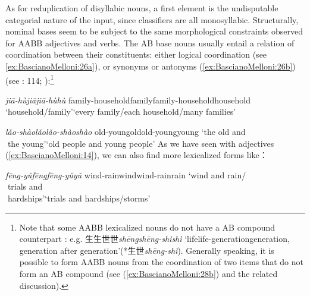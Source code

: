 \documentclass[output=paper]{langsci/langscibook}
\begin{document}
As for reduplication of disyllabic nouns, a first element is the
undisputable categorial nature of the input, since classifiers are all
monosyllabic. Structurally, nominal bases seem to be subject to the same
morphological constraints observed for AABB adjectives and verbs. The AB
base nouns usually entail a relation of coordination between their
constituents: either logical coordination (see \ref{ex:BascianoMelloni:26a}), or synonyms or
antonyms (\ref{ex:BascianoMelloni:26b}) %
(see %
\citealt{Tang79}%
%
: 114; 
\citealt{Zhang2015}
):\footnote{Note that some
  AABB lexicalized nouns do not have a AB compound counterpart %
\citep[see][12]{Wu01}%
%
: e.g.
  生生世世\emph{shēng\tld{}shēng-shì\tld{}shì}
  `life\tld{}life-generation\tld{}generation,
  generation after generation'(*\hspace*{-.1pt}生世\emph{shēng-shì}). Generally
  speaking, it is possible to form AABB nouns from the coordination of
  two items that do not form an AB compound (see (\ref{ex:BascianoMelloni:28b}) and the related
  discussion).}

\ea\label{ex:BascianoMelloni:26}
\ea\label{ex:BascianoMelloni:26a}%
        {\emph{jiā-hù}}{\emph{jiā\tld{}jiā-hù\tld{}hù}}%
        {family-household}{family\emph{\tld{}}family-household\emph{\tld{}}household}%
        {`household/family'}{`every family/each household/many families'}%

\ex\label{ex:BascianoMelloni:26b}%
        {\emph{lǎo-shào}}{\emph{lǎo\tld{}lǎo-shào\tld{}shào}}%
        {old-young}{old\emph{\tld{}}old-young\emph{\tld{}}young}%
        {`the old and\\ \textcolor{white}{`}the young'}{`old people and young people'}%
\z\z
As we have seen with adjectives (\ref{ex:BascianoMelloni:14}), we can also find more lexicalized
forms like：

\ea\label{ex:BascianoMelloni:27}
\ea\label{ex:BascianoMelloni:27a}%
        {\emph{fēng-yǔ}}{\emph{fēng\tld{}fēng-yǔ\tld{}yǔ}}%
        {wind-rain}{wind\emph{\tld{}}wind-rain\emph{\tld{}}rain}%
        {`wind and rain/\\ \textcolor{white}{`}trials and\\ \textcolor{white}{`}hardships'}{`trials and hardships/storms'}%
\end{document}

